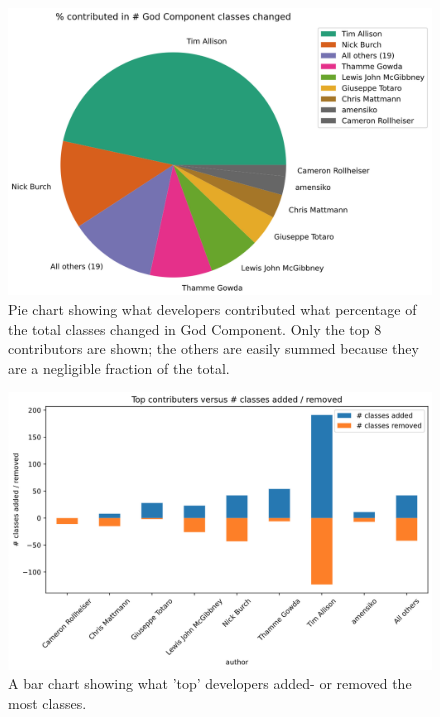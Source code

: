 \documentclass{article}
\begin{document}
\begin{figure}[H]
    \centering
    \includegraphics[width=\textwidth]{report/images/god_components/top-developers.png}
    \caption{Pie chart showing what developers contributed what percentage of the total classes changed in God Component. Only the top 8 contributors are shown; the others are easily summed because they are a negligible fraction of the total.}
    \label{fig:top-developers-pie}
\end{figure}

\begin{figure}[H]
    \centering
    \includegraphics[width=\textwidth]{report/images/god_components/top-developers-barchart.png}
    \caption{A bar chart showing what 'top' developers added- or removed the most classes.}
    \label{fig:top-developers-bar}
\end{figure}
\end{document}
